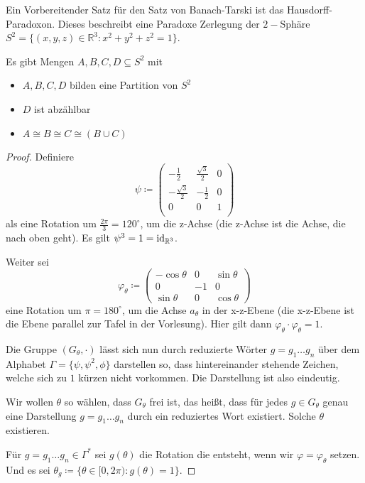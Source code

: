 Ein Vorbereitender Satz für den Satz von Banach-Tarski ist das Hausdorff-Paradoxon. Dieses beschreibt eine Paradoxe Zerlegung der $2-$Sphäre $S^2=\{(x,y,z)\in\mathbb{R}^3 : x^2+y^2+z^2=1\}$.

\begin{satz}
	Es gibt Mengen $A,B,C,D\subseteq S^2$ mit
	\begin{itemize}
		\item $A,B,C,D$ bilden eine Partition von $S^2$
		\item $D$ ist abzählbar
		\item $A\cong B \cong C \cong (B\cup C)$
	\end{itemize}
\end{satz}
\begin{proof}
	Definiere
	$$
	\psi\coloneqq
	\begin{pmatrix}
		-\frac{1}{2} & \frac{\sqrt{3}}{2} & 0 \\
		-\frac{\sqrt{3}}{2} & -\frac{1}{2} & 0 \\
		0 & 0 & 1 \\
	\end{pmatrix}
	$$
	als eine Rotation um $\frac{2\pi}{3}=120^\circ$, um die z-Achse (die z-Achse ist die Achse, die nach \glqq oben\grqq{} geht). Es gilt $\psi^3=1=\operatorname{id}_{\mathbb{R}^3}$.
		
	Weiter sei 
	$$
	\varphi_\theta\coloneqq
	\begin{pmatrix}
		-\cos \theta & 0 & \sin \theta \\
		0 & -1 & 0 \\
		\sin \theta & 0 & \cos \theta 
	\end{pmatrix}
	$$
	eine Rotation um $\pi=180^\circ$, um die Achse $a_\theta$ in der x-z-Ebene (die x-z-Ebene ist die Ebene parallel zur Tafel in der Vorlesung). Hier gilt dann $\varphi_\theta\cdot\varphi_\theta=1$.
	
	Die Gruppe $(G_\theta, \cdot)$ lässt sich nun durch reduzierte Wörter $g=g_1\dots g_n$ über dem Alphabet $\Gamma=\{\psi, \psi^2,\phi\}$ darstellen so, dass hintereinander stehende Zeichen, welche sich zu $1$ kürzen nicht vorkommen. Die Darstellung ist also eindeutig.
	
	Wir wollen $\theta$ so wählen, dass $G_\theta$ frei ist, das heißt, dass für jedes $g\in G_\theta$ genau eine Darstellung $g=g_1\dots g_n$ durch ein reduziertes Wort existiert. Solche $\theta$ existieren.
	
	Für $g=g_1\dots g_n\in \Gamma^\ast$ sei $g(\theta)$ die Rotation die entsteht, wenn wir $\varphi=\varphi_\theta$ setzen. Und es sei $\theta_g\coloneqq\{\theta\in[0,2\pi) : g(\theta)=1\}$.
	

\end{proof}
